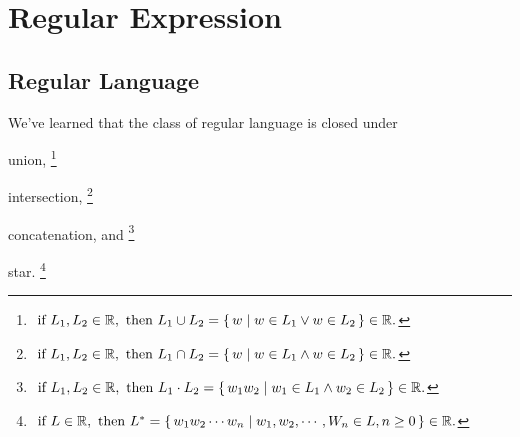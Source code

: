 
\section{Regular Expression}

\subsection{Regular Language}

We've learned that the class of regular language is closed under
\begin{compactitem}
\item union,
    \footnote{
    $
    \text{ if } L_1, L_2 \in \mathbb R,
    \text{ then }
    L_1 \cup L_2 = { \left\{\, w \mid w \in L_1 \lor w \in L_2 \,\right\} }
    \in \mathbb R
    .$
    }
\item intersection,
    \footnote{
    $
    \text{ if } L_1, L_2 \in \mathbb R,
    \text{ then }
    L_1 \cap L_2 = { \left\{\, w \mid w \in L_1 \land w \in L_2 \,\right\} }
    \in \mathbb R
    .$
    }
\item concatenation, and
    \footnote{
        $
        \text{ if } L_1, L_2 \in \mathbb R,
        \text{ then }
        L_1 \cdot L_2 = { \left\{\, w_1w_2 \mid w_1 \in L_1 \land w_2 \in L_2 \,\right\} }
        \in \mathbb R
        .$
    }
\item star.
    \footnote{
        \label{ftnote:star_operation}
        $
        \text{ if } L \in \mathbb R,
        \text{ then }
        L^* = { \left\{\, w_1w_2 \cdots w_n \mid w_1,w_2, \cdots, W_n \in L, n \ge 0 \,\right\} }
        \in \mathbb R
        .$
    }
\end{compactitem}

